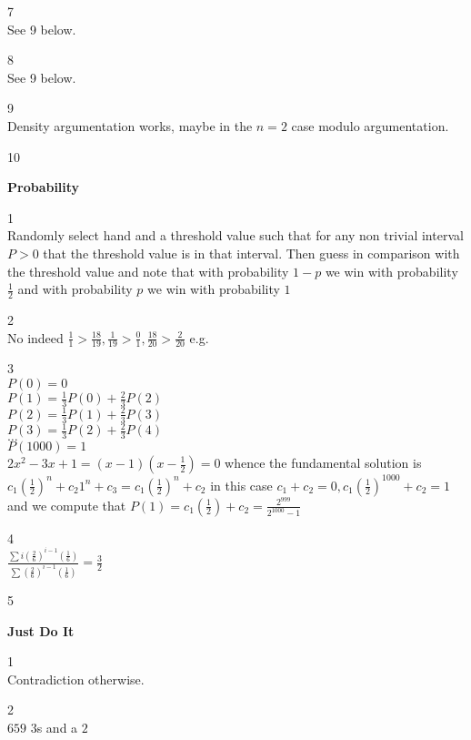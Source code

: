 7 \\
See 9 below.

8 \\
See 9 below.

9 \\
Density argumentation works, maybe in the $n=2$ case modulo argumentation.

10 \\


\newpage

\textbf{Probability}

1 \\
Randomly select hand and a threshold value such that for any non trivial interval $P>0$ that the threshold value is in that interval. Then guess in comparison with the threshold value and note that with probability $1-p$ we win with probability $\frac{1}{2}$ and with probability $p$ we win with probability $1$

2 \\
$\boxed{\text{No}}$ indeed $\frac{1}{1}>\frac{18}{19},\frac{1}{19}>\frac{0}{1},\frac{18}{20}>\frac{2}{20}$ e.g.

3 \\
$P(0)=0$ \\
$P(1)=\frac{1}{3}P(0)+\frac{2}{3}P(2)$ \\
$P(2)=\frac{1}{3}P(1)+\frac{2}{3}P(3)$ \\
$P(3)=\frac{1}{3}P(2)+\frac{2}{3}P(4)$ \\
$\dots$ \\
$P(1000)=1$ \\
$2x^2-3x+1=(x-1)(x-\frac{1}{2})=0$ whence the fundamental solution is $c_1 \left(\frac{1}{2} \right)^n + c_2 1^n + c_3 = c_1 \left(\frac{1}{2} \right)^n + c_2$ in this case $c_1+c_2=0,c_1 \left(\frac{1}{2} \right)^{1000}+c_2=1$ and we compute that $P(1)=c_1 \left(\frac{1}{2} \right)+c_2=\boxed{\frac{2^{999}}{2^{1000}-1}}$

4 \\
$\frac{\sum i\left(\frac{2}{6}\right)^{i-1}\left(\frac{1}{6}\right)}{\sum \left(\frac{2}{6}\right)^{i-1}\left(\frac{1}{6}\right)}=\boxed{\frac{3}{2}}$

5 \\


\newpage

\textbf{Just Do It}

1 \\
Contradiction otherwise.

2 \\
$659$ $3$s and a $2$

